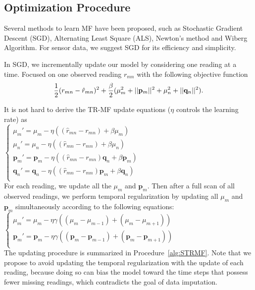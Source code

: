 \subsection{Optimization Procedure}
\label{optimation_procedure}
Several methods to learn MF have been proposed, such as Stochastic Gradient Descent (SGD)\cite{koren2009matrix,chih2008large}, Alternating Least Square (ALS)\cite{koren2009matrix,zhou2008large}, Newton's method\cite{buchanan2005damped} and Wiberg Algorithm\cite{okatani2007wiberg}.
For sensor data, we suggest SGD for its efficiency and simplicity. 

In SGD, we incrementally update our model by considering one reading at a time.
Focused on one observed reading $r_{mn}$ with the following objective function
\begin{equation*} \small \frac{1}{2}(r_{mn} - \hat{r}_{mn})^2
+ \frac{\beta}{2}(\mu_m^2 + ||\mathbf{p}_m||^2 + \mu_n^2 + ||\mathbf{q}_n||^2).\end{equation*}

It is not hard to derive the TR-MF update equations ($\eta$ controls the learning rate) as \\
\indent	$ \begin{cases} 
	\mu_m' = \mu_m - \eta ((\hat{r}_{mn}-r_{mn}) + \beta \mu_m) \\
	\mu_n' = \mu_n - \eta ((\hat{r}_{mn}-r_{mn}) + \beta \mu_n) \\
	\mathbf{p}_{m}' = \mathbf{p}_{m} - \eta ((\hat{r}_{mn}-r_{mn})\mathbf{q}_{n} + \beta \mathbf{p}_{m})\\
	\mathbf{q}_{n}' = \mathbf{q}_{n} - \eta ((\hat{r}_{mn}-r_{mn})\mathbf{p}_{m} + \beta \mathbf{q}_{n})\\
	\end{cases} $ \\
For each reading, we update all the $\mu_m$ and $\mathbf{p}_m$. Then after a full scan of all observed readings, 
we perform temporal regularization by updating all $\mu_m$ and $\mathbf{p}_m$ simultaneously according to the following equations:\\
\indent $ \begin{cases}
	\mu_m' = \mu_m - \eta \gamma((\mu_m-\mu_{m-1})+(\mu_m-\mu_{m+1}))\\
	\mathbf{p}_{m}' = \mathbf{p}_{m} - \eta \gamma((\mathbf{p}_{m}-\mathbf{p}_{m-1})+(\mathbf{p}_{m}-\mathbf{p}_{m+1}))\\
	\end{cases} $\\
The updating procedure is summarized in Procedure~\ref{alg:STRMF}. Note that we propose to avoid updating the temporal regularization with the update of each reading, because doing so can bias the model toward the time steps that possess fewer missing readings, which contradicts the goal of data imputation. 

